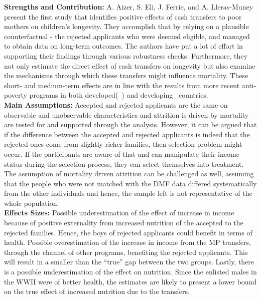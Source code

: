 \textbf{Strengths and Contribution:} A. Aizer, S. Eli, J. Ferrie, and A. Lleras-Muney present the first study that identifies positive effects of cash transfers to poor mothers on children's longevity. They accomplish that by relying on a plausible counterfactual - the rejected applicants who were deemed eligible, and managed to obtain data on long-term outcomes. The authors have put a lot of effort in supporting their findings through various robustness checks. Furthermore, they not only estimate the direct effect of cash transfers on longevity but also examine the mechanisms through which these transfers might influence mortality. These short- and medium-term effects are in line with the results from more recent anti-poverty programs in both developed(~\citep{almond2011inside,hoynes2016long,dahl2012impact,milligan2011child}) and developing~\citep{barham2011healthier,barham2013living} countries. \\
\textbf{Main Assumptions:} Accepted and rejected applicants are the same on observable and unobservable characteristics and attrition is driven by mortality are tested for and supported through the analysis. However, it can be argued that if the difference between the accepted and rejected applicants is indeed that the rejected ones come from slightly richer families, then selection problem might occur. If the participants are aware of that and can manipulate their income status during the selection process, they can select themselves into treatment. The assumption of mortality driven attrition can be challenged as well, assuming that the people who were not matched with the DMF data differed systematically from the other individuals and hence, the sample left is not representative of the whole population. \\
\textbf{Effects Sizes:} Possible underestimation of the effect of increase in income because of positive
externality from increased nutrition of the accepted to the rejected families. Hence, the boys of rejected applicants could benefit in terms of health. Possible overestimation of the increase in income from the MP transfers, through the channel of other programs, benefiting the rejected applicants. This will result in a smaller than the ``true'' gap between the two groups. Lastly, there is a possible underestimation of the effect on nutrition. Since the enlisted males in the WWII were of better health, the estimates are likely to present a lower bound on the true effect of increased nutrition due to the transfers. \\
